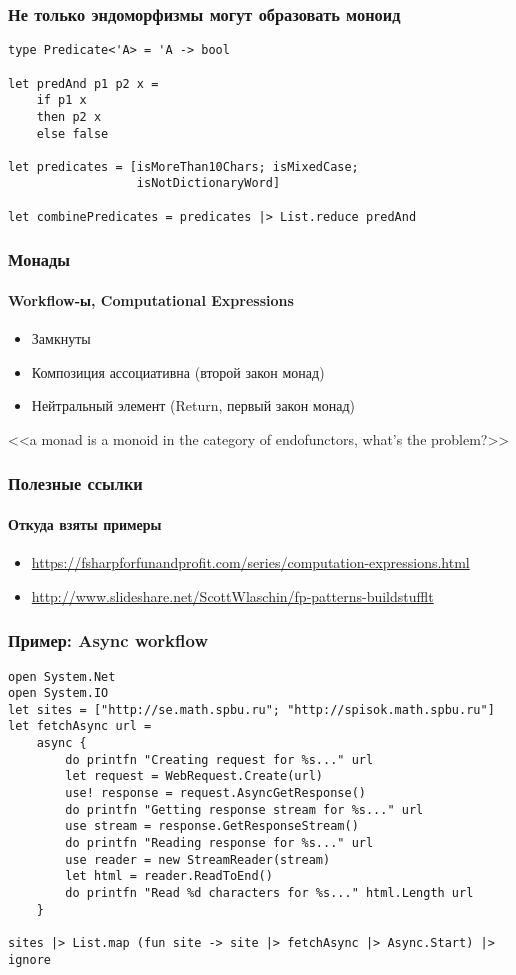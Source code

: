 \documentclass[xetex,mathserif,serif]{beamer}
\begin{document}
	\begin{frame}[fragile]
		\frametitle{Не только эндоморфизмы могут образовать моноид}
		\begin{verbatim}
type Predicate<'A> = 'A -> bool

let predAnd p1 p2 x = 
    if p1 x 
    then p2 x
    else false

let predicates = [isMoreThan10Chars; isMixedCase; 
                  isNotDictionaryWord]

let combinePredicates = predicates |> List.reduce predAnd
		\end{verbatim}
\end{frame}

	\begin{frame}
		\frametitle{Монады}
		\framesubtitle{Workflow-ы, Computational Expressions}
		\begin{itemize}
			\item Замкнуты
			\item Композиция ассоциативна (второй закон монад)
			\item Нейтральный элемент (Return, первый закон монад)
		\end{itemize}
		<<a monad is a monoid in the category of endofunctors, what's the problem?>>
	\end{frame}

	\begin{frame}
		\frametitle{Полезные ссылки}
		\framesubtitle{Откуда взяты примеры}
		\begin{small}
			\begin{itemize}
				\item \url{https://fsharpforfunandprofit.com/series/computation-expressions.html}
				\item \url{http://www.slideshare.net/ScottWlaschin/fp-patterns-buildstufflt}
			\end{itemize}
		\end{small}
	\end{frame}

	\begin{frame}[fragile]
		\frametitle{Пример: Async workflow}
		\begin{footnotesize}
			\begin{verbatim}
open System.Net
open System.IO
let sites = ["http://se.math.spbu.ru"; "http://spisok.math.spbu.ru"]
let fetchAsync url =
    async { 
        do printfn "Creating request for %s..." url
        let request = WebRequest.Create(url)
        use! response = request.AsyncGetResponse()
        do printfn "Getting response stream for %s..." url
        use stream = response.GetResponseStream()
        do printfn "Reading response for %s..." url
        use reader = new StreamReader(stream)
        let html = reader.ReadToEnd()
        do printfn "Read %d characters for %s..." html.Length url 
    }

sites |> List.map (fun site -> site |> fetchAsync |> Async.Start) |> ignore
			\end{verbatim}
		\end{footnotesize}
\end{frame}
\end{document}

